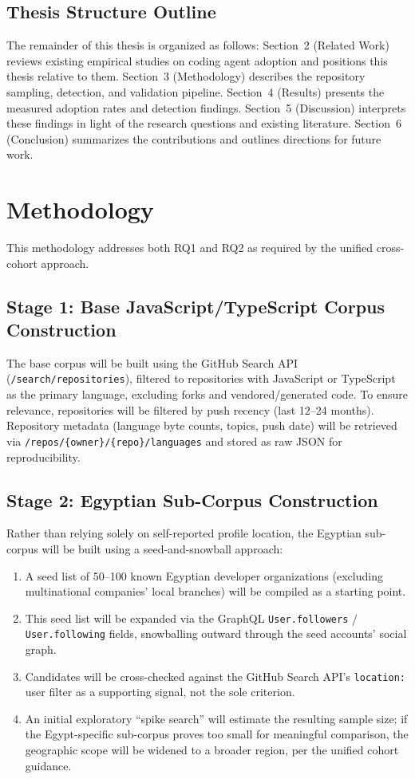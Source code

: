 \documentclass[11pt,a4paper]{article}
\begin{document}
\subsection{Thesis Structure Outline}

The remainder of this thesis is organized as follows: Section~2 (Related Work) reviews existing empirical studies on coding agent adoption and positions this thesis relative to them. Section~3 (Methodology) describes the repository sampling, detection, and validation pipeline. Section~4 (Results) presents the measured adoption rates and detection findings. Section~5 (Discussion) interprets these findings in light of the research questions and existing literature. Section~6 (Conclusion) summarizes the contributions and outlines directions for future work.


\section{Methodology}
This methodology addresses both RQ1 and RQ2 as required by the unified cross-cohort approach.

\subsection{Stage 1: Base JavaScript/TypeScript Corpus Construction}
The base corpus will be built using the GitHub Search API (\texttt{/search/repositories}), filtered to repositories with JavaScript or TypeScript as the primary language, excluding forks and vendored/generated code. To ensure relevance, repositories will be filtered by push recency (last 12--24 months). Repository metadata (language byte counts, topics, push date) will be retrieved via \texttt{/repos/\{owner\}/\{repo\}/languages} and stored as raw JSON for reproducibility.

\subsection{Stage 2: Egyptian Sub-Corpus Construction}
Rather than relying solely on self-reported profile location, the Egyptian sub-corpus will be built using a seed-and-snowball approach:
\begin{enumerate}
    \item A seed list of 50--100 known Egyptian developer organizations (excluding multinational companies' local branches) will be compiled as a starting point.
    \item This seed list will be expanded via the GraphQL \texttt{User.followers} / \texttt{User.following} fields, snowballing outward through the seed accounts' social graph.
    \item Candidates will be cross-checked against the GitHub Search API's \texttt{location:} user filter as a supporting signal, not the sole criterion.
    \item An initial exploratory ``spike search'' will estimate the resulting sample size; if the Egypt-specific sub-corpus proves too small for meaningful comparison, the geographic scope will be widened to a broader region, per the unified cohort guidance.
\end{enumerate}
\end{document}
